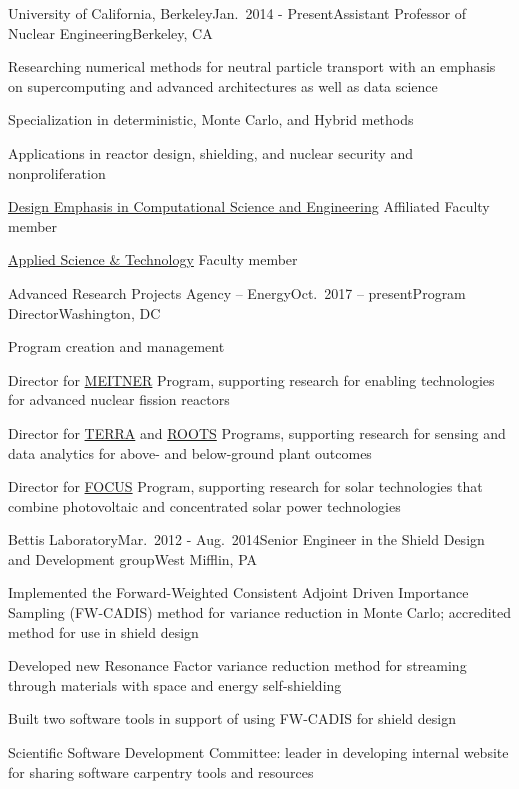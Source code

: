 \begin{rSubsection}{University of California, Berkeley}{Jan.\ 2014 - Present}{Assistant Professor of Nuclear Engineering}{Berkeley, CA}
\item Researching numerical methods for neutral particle transport with an emphasis on supercomputing and advanced architectures as well as data science
\item Specialization in deterministic, Monte Carlo, and Hybrid methods
\item Applications in reactor design, shielding, and nuclear security and nonproliferation
\item \href{http://citris-uc.org/decse-mission/}{Design Emphasis  in Computational Science and Engineering} Affiliated Faculty member
\item \href{http://ast.coe.berkeley.edu/}{Applied Science \& Technology} Faculty member
\end{rSubsection}


\begin{rSubsection}{Advanced Research Projects Agency -- Energy}{Oct.\ 2017 -- present}{Program Director}{Washington, DC}
\item Program creation and management
\item Director for \href{https://arpa-e.energy.gov/?q=arpa-e-programs/meitner}{MEITNER} Program, supporting research for enabling technologies for advanced nuclear fission reactors
\item Director for \href{https://arpa-e.energy.gov/?q=arpa-e-programs/terra}{TERRA} and \href{https://arpa-e.energy.gov/?q=arpa-e-programs/roots}{ROOTS} Programs, supporting research for sensing and data analytics for above- and below-ground plant outcomes
\item Director for \href{https://arpa-e.energy.gov/?q=arpa-e-programs/focus}{FOCUS} Program, supporting research for solar technologies that combine photovoltaic and concentrated solar power technologies
\end{rSubsection}



\begin{rSubsection}{Bettis Laboratory}{Mar.\ 2012 - Aug.\ 2014}{Senior Engineer in the Shield Design and Development group}{West Mifflin, PA}
\item Implemented the Forward-Weighted Consistent Adjoint Driven Importance Sampling (FW-CADIS) method for variance reduction in Monte Carlo; accredited method for use in shield design
\item Developed new Resonance Factor variance reduction method for streaming through materials with space and energy self-shielding
\item Built two software tools in support of using FW-CADIS for shield design
\item Scientific Software Development Committee: leader in developing internal website for sharing software carpentry tools and resources
\end{rSubsection}


